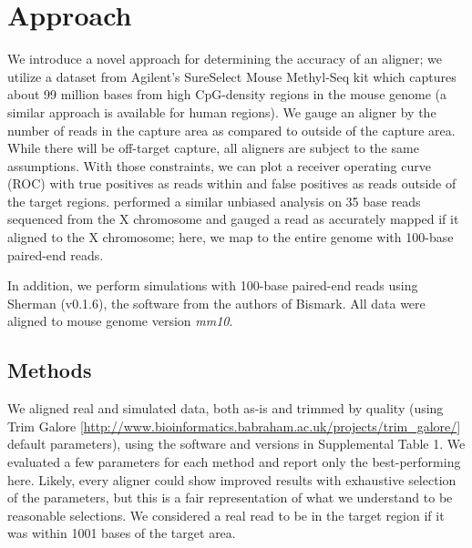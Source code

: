 \documentclass{bioinfo}
\begin{document}
\section{Approach}
We introduce a novel approach for determining the accuracy of an aligner;
we utilize a dataset from Agilent's SureSelect Mouse Methyl-Seq kit which
captures about
99 million bases from high CpG-density regions in the mouse genome (a similar
approach is available for human regions).
We gauge an aligner by the number of reads in the capture area as compared
to outside of the capture area. While there will be off-target capture, all
aligners are subject to the same assumptions. With those constraints, we can
plot a receiver operating curve (ROC) with true positives as reads within
and false positives as reads outside of the target regions.
\citealp{shrestha} performed a similar unbiased analysis on 35 base reads sequenced from
the X chromosome and gauged a read as accurately mapped if it aligned
to the X chromosome; here, we map to the entire genome with 100-base paired-end reads.

In addition, we perform simulations with 100-base paired-end reads using
Sherman (v0.1.6), the software from the authors of Bismark. All data were
aligned to mouse genome version \textit{mm10}.

\begin{methods}
\section{Methods}
We aligned real and simulated data, both as-is and trimmed by quality (using Trim Galore
[\href{http://www.bioinformatics.babraham.ac.uk/projects/trim\_galore/}{http://www.bioinformatics.babraham.ac.uk/projects/trim\_galore/}]
default parameters), using the software and versions in Supplemental Table 1.
We evaluated a few parameters for each method and report only the
best-performing here. Likely, every aligner could show improved results with
exhaustive selection of the parameters, but this is a fair representation of
what we understand to be reasonable selections.
We considered a real read to be in the target region if it was within 1001 bases
of the target area.

\end{methods}
\end{document}
